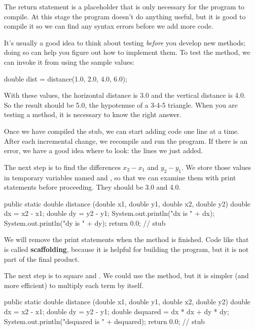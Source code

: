 The return statement is a placeholder that is only necessary for the program to compile.
At this stage the program doesn't do anything useful, but it is good to compile it so we can find any syntax errors before we add more code.


It's usually a good idea to think about testing {\em before} you develop new methods; doing so can help you figure out how to implement them.
To test the method, we can invoke it from  using the sample values:

\begin{code}
double dist = distance(1.0, 2.0, 4.0, 6.0);
\end{code}

With these values, the horizontal distance is 3.0 and the vertical distance is 4.0.
So the result should be 5.0, the hypotenuse of a 3-4-5 triangle.
When you are testing a method, it is necessary to know the right answer.

Once we have compiled the stub, we can start adding code one line at a time.
After each incremental change, we recompile and run the program.
If there is an error, we have a good idea where to look: the lines we just added.

The next step is to find the differences $x_2 - x_1$ and $y_2 - y_1$.
We store those values in temporary variables named  and , so that we can examine them with print statements before proceeding.
They should be 3.0 and 4.0.

\begin{code}
public static double distance
        (double x1, double y1, double x2, double y2) {
    double dx = x2 - x1;
    double dy = y2 - y1;
    System.out.println("dx is " + dx);
    System.out.println("dy is " + dy);
    return 0.0;  // stub
}
\end{code}


We will remove the print statements when the method is finished.
Code like that is called {\bf scaffolding}, because it is helpful for building the program, but it is not part of the final product.

The next step is to square  and .
We could use the  method, but it is simpler (and more efficient) to multiply each term by itself.

\begin{code}
public static double distance
        (double x1, double y1, double x2, double y2) {
    double dx = x2 - x1;
    double dy = y2 - y1;
    double dsquared = dx * dx + dy * dy;
    System.out.println("dsquared is " + dsquared);
    return 0.0;  // stub
}
\end{code}

